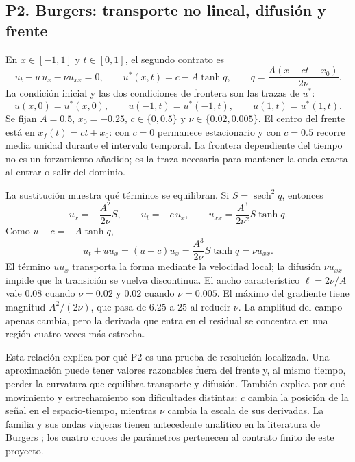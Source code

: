 \subsection{P2. Burgers: transporte no lineal, difusión y frente}

En $x\in[-1,1]$ y $t\in[0,1]$, el segundo contrato es
\begin{equation}
u_t+u\,u_x-\nu u_{xx}=0,
\qquad
u^*(x,t)=c-A\tanh q,
\qquad
q=\frac{A(x-ct-x_0)}{2\nu}.
\label{eq:expansion-p2-burgers}
\end{equation}
La condición inicial y las dos condiciones de frontera son las trazas de
$u^*$:
\begin{equation}
u(x,0)=u^*(x,0),
\qquad
u(-1,t)=u^*(-1,t),
\qquad
u(1,t)=u^*(1,t).
\label{eq:expansion-p2-conditions}
\end{equation}
Se fijan $A=0.5$, $x_0=-0.25$,
$c\in\{0,0.5\}$ y $\nu\in\{0.02,0.005\}$. El centro del frente está en
$x_f(t)=ct+x_0$: con $c=0$ permanece estacionario y con $c=0.5$ recorre
media unidad durante el intervalo temporal. La frontera dependiente del
tiempo no es un forzamiento añadido; es la traza necesaria para mantener la
onda exacta al entrar o salir del dominio.

La sustitución muestra qué términos se equilibran. Si
$S=\operatorname{sech}^2q$, entonces
\begin{equation}
u_x=-\frac{A^2}{2\nu}S,
\qquad
u_t=-c\,u_x,
\qquad
u_{xx}=\frac{A^3}{2\nu^2}S\tanh q.
\label{eq:expansion-p2-derivatives}
\end{equation}
Como $u-c=-A\tanh q$,
\begin{equation}
u_t+u u_x=(u-c)u_x
 =\frac{A^3}{2\nu}S\tanh q
 =\nu u_{xx}.
\label{eq:expansion-p2-balance}
\end{equation}
El término $u u_x$ transporta la forma mediante la velocidad local; la
difusión $\nu u_{xx}$ impide que la transición se vuelva discontinua. El
ancho característico $\ell=2\nu/A$ vale $0.08$ cuando $\nu=0.02$ y
$0.02$ cuando $\nu=0.005$. El máximo del gradiente tiene magnitud
$A^2/(2\nu)$, que pasa de $6.25$ a $25$ al reducir $\nu$. La amplitud del
campo apenas cambia, pero la derivada que entra en el residual se concentra
en una región cuatro veces más estrecha.

Esta relación explica por qué P2 es una prueba de resolución localizada. Una
aproximación puede tener valores razonables fuera del frente y, al mismo
tiempo, perder la curvatura que equilibra transporte y difusión. También
explica por qué movimiento y estrechamiento son dificultades distintas: $c$
cambia la posición de la señal en el espacio-tiempo, mientras $\nu$ cambia
la escala de sus derivadas. La familia y sus ondas viajeras tienen antecedente
analítico en la literatura de Burgers \cite{burgerswaves2025}; los cuatro
cruces de parámetros pertenecen al contrato finito de este proyecto.

